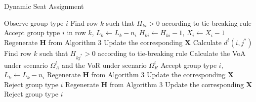 \begin{algorithm}[H]
  \caption{Dynamic Seat Assignment}\label{algo_dynamic_policy}
  { Observe group type $i$\;
    {Find row $k$ such that $H_{ki} >0$ according to tie-breaking rule\; Accept group type $i$ in row $k$, $L_{k} \gets L_{k} -n_{i}$\; $H_{ki} \gets H_{ki} -1$, $X_{i} \gets X_{i} -1$
    {Regenerate $\bm{H}$ from Algorithm 3\; Update the corresponding $\bm{X}$}
    }
    {Calculate $d^{t}(i, j^{*})$\;
    {Find row $k$ such that $H_{kj^{*}} > 0$ according to tie-breaking rule\; 
    Calculate the VoA under scenario $\Omega^{t}_{A}$ and the VoR under scenario $\Omega^{t}_{R}$\;
    {Accept group type $i$, $L_{k} \gets L_{k} - n_{i}$\; Regenerate $\bm{H}$ from Algorithm 3\; Update the corresponding $\bm{X}$\;}
    {Reject group type $i$\; Regenerate $\bm{H}$ from Algorithm 3\; Update the corresponding $\bm{X}$\;}}
    {Reject group type $i$\;}
    }}
\end{algorithm}









